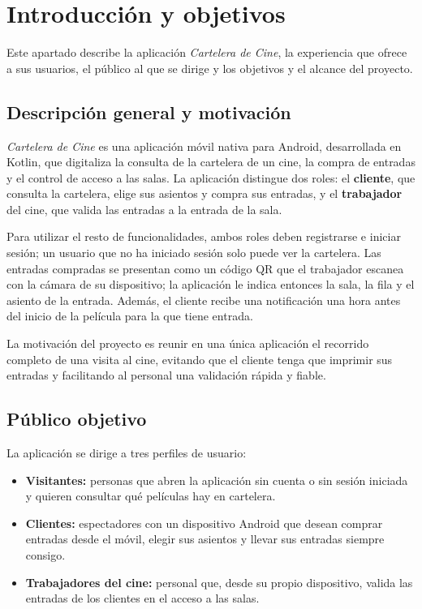 \documentclass[11pt,a4paper]{article}
\begin{document}
\section{Introducción y objetivos}
Este apartado describe la aplicación \textit{Cartelera de Cine}, la experiencia que ofrece a sus usuarios, el público al que se dirige y los objetivos y el alcance del proyecto.

\subsection{Descripción general y motivación}
\textit{Cartelera de Cine} es una aplicación móvil nativa para Android, desarrollada en Kotlin, que digitaliza la consulta de la cartelera de un cine, la compra de entradas y el control de acceso a las salas. La aplicación distingue dos roles: el \textbf{cliente}, que consulta la cartelera, elige sus asientos y compra sus entradas, y el \textbf{trabajador} del cine, que valida las entradas a la entrada de la sala.

Para utilizar el resto de funcionalidades, ambos roles deben registrarse e iniciar sesión; un usuario que no ha iniciado sesión solo puede ver la cartelera. Las entradas compradas se presentan como un código QR que el trabajador escanea con la cámara de su dispositivo; la aplicación le indica entonces la sala, la fila y el asiento de la entrada. Además, el cliente recibe una notificación una hora antes del inicio de la película para la que tiene entrada.

La motivación del proyecto es reunir en una única aplicación el recorrido completo de una visita al cine, evitando que el cliente tenga que imprimir sus entradas y facilitando al personal una validación rápida y fiable.

\subsection{Público objetivo}
La aplicación se dirige a tres perfiles de usuario:
\begin{itemize}
    \item \textbf{Visitantes:} personas que abren la aplicación sin cuenta o sin sesión iniciada y quieren consultar qué películas hay en cartelera.
    \item \textbf{Clientes:} espectadores con un dispositivo Android que desean comprar entradas desde el móvil, elegir sus asientos y llevar sus entradas siempre consigo.
    \item \textbf{Trabajadores del cine:} personal que, desde su propio dispositivo, valida las entradas de los clientes en el acceso a las salas.
\end{itemize}
\end{document}
